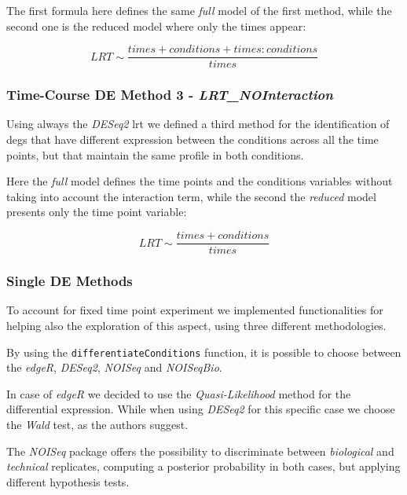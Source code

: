 The first formula here defines the same \textit{full} model of the first method, while the second one is the reduced model where only the times appear:

\[LRT \sim \frac{times+conditions+times:conditions}{times}\]


\subsubsection{Time-Course DE Method 3 - \textit{LRT\_NOInteraction}}
Using always the \textit{DESeq2} \gls{lrt} we defined a third method for the 
identification of \glspl{deg} that have different expression between the conditions across all the time points, but that maintain the same profile in both conditions.

Here the \textit{full} model defines the time points and the conditions variables without taking into account the interaction term, while the second the \textit{reduced} model presents only the time point variable:

\[LRT \sim \frac{times+conditions}{times}\]


%


\subsubsection{Single DE Methods}

To account for fixed time point experiment we implemented functionalities for helping also the exploration of this aspect, using three different methodologies.
 

By using the \lstinline!differentiateConditions! function, it is possible to choose between the \textit{edgeR}, \textit{DESeq2}, \textit{NOISeq} and \textit{NOISeqBio}.

In case of \textit{edgeR} we decided to use the \textit{Quasi-Likelihood} method for the differential expression.
While when using \textit{DESeq2} for this specific case we choose the \textit{Wald} test, as the authors suggest.

The \textit{NOISeq} package offers the possibility to discriminate between \textit{biological} and \textit{technical} replicates, computing a posterior probability in both cases, but applying different hypothesis tests.




